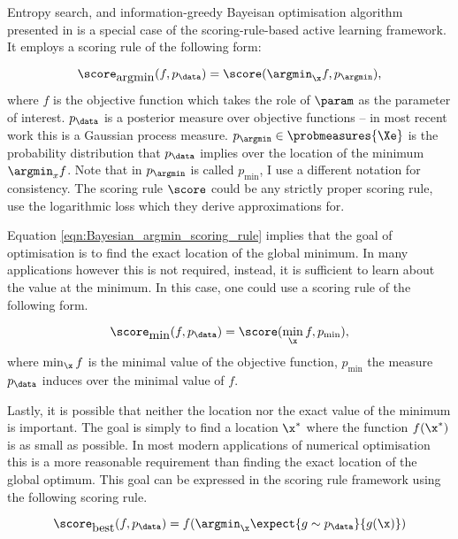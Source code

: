 Entropy search, and information-greedy Bayeisan optimisation algorithm presented in \citep{Hennig2012entropy} is a special case of the scoring-rule-based active learning framework. It employs a scoring rule of the following form:

\begin{equation}
	\score_{\mbox{argmin}}(f,p_\data) = \score(\argmin_{\x}f,p_{\argmin}), \label{eqn:Bayesian_argmin_scoring_rule}
\end{equation}
where $f$ is the objective function which takes the role of $\param$ as the parameter of interest. $p_\data$ is a posterior measure over objective functions -- in most recent work this is a Gaussian process measure. $p_{\argmin} \in \probmeasures{\Xe}$ is the probability distribution that $p_\data$ implies over the location of the minimum $\argmin_{x}f$. Note that in \citep{Hennig2012entropy} $p_{\argmin}$ is called $p_{\min}$, I use a different notation for consistency. The scoring rule $\score$ could be any strictly proper scoring rule, \citeauthor{Hennig2012entropy} use the logarithmic loss which they derive approximations for.

Equation \eqref{eqn:Bayesian_argmin_scoring_rule} implies that the goal of optimisation is to find the exact location of the global minimum. In many applications however this is not required, instead, it is sufficient to learn about the value at the minimum. In this case, one could use a scoring rule of the following form.

\begin{equation}
	\score_{\mbox{min}}(f,p_\data) = \score(\min_{\x}f,p_{\min}), \label{eqn:Bayesian_argmin_scoring_rule}
\end{equation}
where $\min_{\x}f$ is the minimal value of the objective function, $p_{\min}$ the measure $p_\data$ induces over the minimal value of $f$.

Lastly, it is possible that neither the location nor the exact value of the minimum is important. The goal is simply to find a location $\x^{*}$ where the function $f(\x^{*})$ is as small as possible. In most modern applications of numerical optimisation this is a more reasonable requirement than finding the exact location of the global optimum. This goal can be expressed in the scoring rule framework using the following scoring rule.

\begin{equation}
	\score_{\mbox{best}}(f,p_\data) = f(\argmin_{\x}\expect{g\sim p_\data}{g(\x)}) \label{eqn:Bayesian_optimisation_scoring_rule}
\end{equation}

